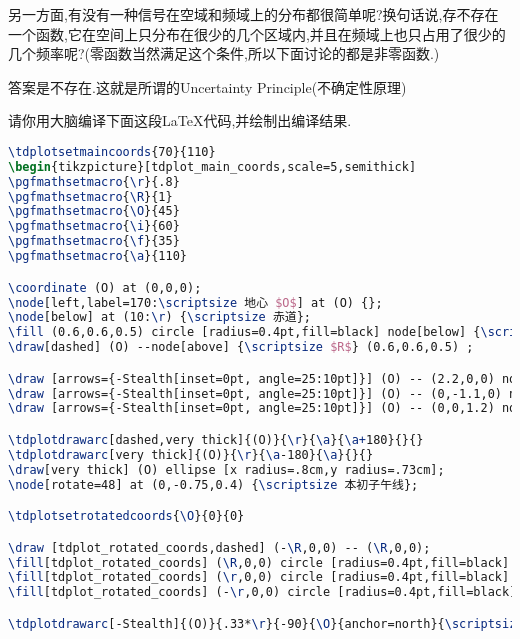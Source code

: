 \documentclass[list,answers,csize4,custom]{sysuexam}
\begin{document}
\begin{groups}
\begin{questions}[rs]
\begin{solution}
        \sj 另一方面,有没有一种信号在空域和频域上的分布都很简单呢?换句话说,存不存在一个函数,它在空间上只分布在很少的几个区域内,并且在频域上也只占用了很少的几个频率呢?(零函数当然满足这个条件,所以下面讨论的都是非零函数.)

        \sj 答案是不存在.这就是所谓的Uncertainty Principle(不确定性原理)
    \end{solution}
\end{questions}

\begin{questions}[rs]
    \question[5]请你用大脑编译下面这段\LaTeX{}代码,并绘制出编译结果.
    \begin{lstlisting}[title=题六1代码,language=tex,basicstyle={\ttfamily\footnotesize}]
\tdplotsetmaincoords{70}{110}
\begin{tikzpicture}[tdplot_main_coords,scale=5,semithick]
\pgfmathsetmacro{\r}{.8}
\pgfmathsetmacro{\R}{1}
\pgfmathsetmacro{\O}{45}
\pgfmathsetmacro{\i}{60}
\pgfmathsetmacro{\f}{35}
\pgfmathsetmacro{\a}{110}

\coordinate (O) at (0,0,0);
\node[left,label=170:\scriptsize 地心 $O$] at (O) {};
\node[below] at (10:\r) {\scriptsize 赤道};
\fill (0.6,0.6,0.5) circle [radius=0.4pt,fill=black] node[below] {\scriptsize $T$};
\draw[dashed] (O) --node[above] {\scriptsize $R$} (0.6,0.6,0.5) ;

\draw [arrows={-Stealth[inset=0pt, angle=25:10pt]}] (O) -- (2.2,0,0) node[anchor=north east] {\scriptsize $y$};
\draw [arrows={-Stealth[inset=0pt, angle=25:10pt]}] (O) -- (0,-1.1,0) node[anchor=north west] {\scriptsize $x$};
\draw [arrows={-Stealth[inset=0pt, angle=25:10pt]}] (O) -- (0,0,1.2) node[anchor=west] {\scriptsize $z$ 北极};

\tdplotdrawarc[dashed,very thick]{(O)}{\r}{\a}{\a+180}{}{}
\tdplotdrawarc[very thick]{(O)}{\r}{\a-180}{\a}{}{}
\draw[very thick] (O) ellipse [x radius=.8cm,y radius=.73cm];
\node[rotate=48] at (0,-0.75,0.4) {\scriptsize 本初子午线};

\tdplotsetrotatedcoords{\O}{0}{0}

\draw [tdplot_rotated_coords,dashed] (-\R,0,0) -- (\R,0,0);
\fill[tdplot_rotated_coords] (\R,0,0) circle [radius=0.4pt,fill=black] node[right]{\scriptsize 近地点};
\fill[tdplot_rotated_coords] (\r,0,0) circle [radius=0.4pt,fill=black] node[below left=2pt]{\scriptsize 升交点};
\fill[tdplot_rotated_coords] (-\r,0,0) circle [radius=0.4pt,fill=black] node[above right]{\scriptsize 降交点};

\tdplotdrawarc[-Stealth]{(O)}{.33*\r}{-90}{\O}{anchor=north}{\scriptsize $\Omega$}


\end{lstlisting}
\end{questions}
\end{groups}
\end{document}
